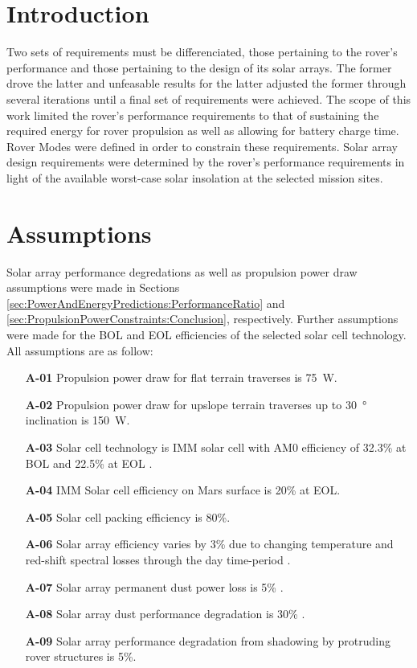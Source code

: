 \section{Introduction}
\label{sec:RequirementsAndDesignDrivers:Introduction}
Two sets of requirements must be differenciated, those pertaining to the rover's performance and those pertaining to the design of its solar arrays. The former drove the latter and unfeasable results for the latter adjusted the former through several iterations until a final set of requirements were achieved. The scope of this work limited the rover's performance requirements to that of sustaining the required energy for rover propulsion as well as allowing for battery charge time. Rover Modes were defined in order to constrain these requirements. Solar array design requirements were determined by the rover's performance requirements in light of the available worst-case solar insolation at the selected mission sites.


\section{Assumptions}
\label{sec:RequirementsAndDesignDrivers:Assumptions}
Solar array performance degredations as well as propulsion power draw assumptions were made in Sections \ref{sec:PowerAndEnergyPredictions:PerformanceRatio} and \ref{sec:PropulsionPowerConstraints:Conclusion}, respectively. Further assumptions were made for the \ac{BOL} and \ac{EOL} efficiencies of the selected solar cell technology. All assumptions are as follow:


\begin{itemize}
    \item[\textbf{A-01}] Propulsion power draw for flat terrain traverses is \SI{75}{\watt}.
    \item[\textbf{A-02}] Propulsion power draw for upslope terrain traverses up to \SI{30}{\degree} inclination is \SI{150}{\watt}.
    \item[\textbf{A-03}] Solar cell technology is \ac{IMM} solar cell with AM0 efficiency of 32.3\% at \ac{BOL} and 22.5\% at \ac{EOL} .
    \item[\textbf{A-04}] IMM Solar cell efficiency on Mars surface is 20\% at \ac{EOL}.
    \item[\textbf{A-05}] Solar cell packing efficiency is 80\%.
    \item[\textbf{A-06}] Solar array efficiency varies by 3\% due to changing temperature and red-shift spectral losses through the day time-period .
    \item[\textbf{A-07}] Solar array permanent dust power loss is 5\% .
    \item[\textbf{A-08}] Solar array dust performance degradation is 30\% .
    \item[\textbf{A-09}] Solar array performance degradation from shadowing by protruding rover structures is 5\%.
\end{itemize}




